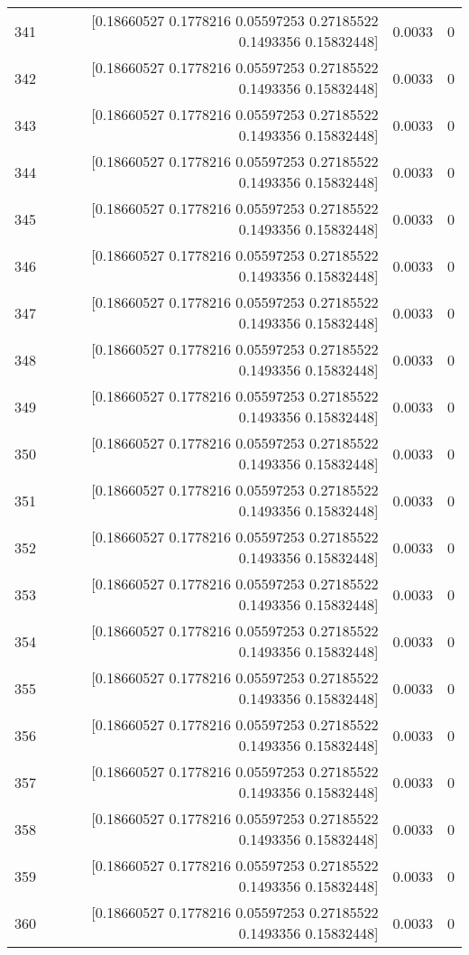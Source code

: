 \begin{longtable}{lrrr}
341 & [0.18660527 0.1778216  0.05597253 0.27185522 0.1493356  0.15832448] & 0.0033 & 0 \\
342 & [0.18660527 0.1778216  0.05597253 0.27185522 0.1493356  0.15832448] & 0.0033 & 0 \\
343 & [0.18660527 0.1778216  0.05597253 0.27185522 0.1493356  0.15832448] & 0.0033 & 0 \\
344 & [0.18660527 0.1778216  0.05597253 0.27185522 0.1493356  0.15832448] & 0.0033 & 0 \\
345 & [0.18660527 0.1778216  0.05597253 0.27185522 0.1493356  0.15832448] & 0.0033 & 0 \\
346 & [0.18660527 0.1778216  0.05597253 0.27185522 0.1493356  0.15832448] & 0.0033 & 0 \\
347 & [0.18660527 0.1778216  0.05597253 0.27185522 0.1493356  0.15832448] & 0.0033 & 0 \\
348 & [0.18660527 0.1778216  0.05597253 0.27185522 0.1493356  0.15832448] & 0.0033 & 0 \\
349 & [0.18660527 0.1778216  0.05597253 0.27185522 0.1493356  0.15832448] & 0.0033 & 0 \\
350 & [0.18660527 0.1778216  0.05597253 0.27185522 0.1493356  0.15832448] & 0.0033 & 0 \\
351 & [0.18660527 0.1778216  0.05597253 0.27185522 0.1493356  0.15832448] & 0.0033 & 0 \\
352 & [0.18660527 0.1778216  0.05597253 0.27185522 0.1493356  0.15832448] & 0.0033 & 0 \\
353 & [0.18660527 0.1778216  0.05597253 0.27185522 0.1493356  0.15832448] & 0.0033 & 0 \\
354 & [0.18660527 0.1778216  0.05597253 0.27185522 0.1493356  0.15832448] & 0.0033 & 0 \\
355 & [0.18660527 0.1778216  0.05597253 0.27185522 0.1493356  0.15832448] & 0.0033 & 0 \\
356 & [0.18660527 0.1778216  0.05597253 0.27185522 0.1493356  0.15832448] & 0.0033 & 0 \\
357 & [0.18660527 0.1778216  0.05597253 0.27185522 0.1493356  0.15832448] & 0.0033 & 0 \\
358 & [0.18660527 0.1778216  0.05597253 0.27185522 0.1493356  0.15832448] & 0.0033 & 0 \\
359 & [0.18660527 0.1778216  0.05597253 0.27185522 0.1493356  0.15832448] & 0.0033 & 0 \\
360 & [0.18660527 0.1778216  0.05597253 0.27185522 0.1493356  0.15832448] & 0.0033 & 0 \\

\end{longtable}

